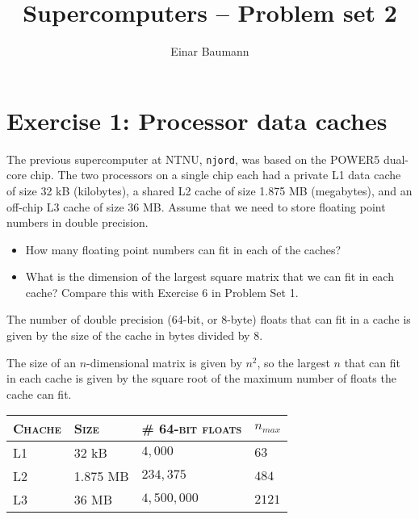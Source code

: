 




\title{Supercomputers -- Problem set 2}
\author{Einar Baumann}
\maketitle

\section{Exercise 1: Processor data caches} %
\label{sec:exercise_1}
\begin{question}
  The previous supercomputer at NTNU, \texttt{njord}, was based on the POWER5 dual-core chip. The two processors on a single chip each had a private L1 data cache of size 32 kB (kilobytes), a shared L2 cache of size 1.875 MB (megabytes), and an off-chip L3 cache of size 36 MB. Assume that we need to store floating point numbers in double precision. 

  \begin{itemize}
    \item How many floating point numbers can fit in each of the caches?
    \item What is the dimension of the largest square matrix that we can fit in each cache? Compare this with Exercise 6  in Problem Set 1.
  \end{itemize}
\end{question}


The number of double precision (64-bit, or 8-byte) floats that can fit in a cache is given by the size of the cache in bytes divided by 8.

The size of an $n$-dimensional matrix is given by $n^2$, so the largest $n$ that can fit in each cache is given by the square root of the maximum number of floats the cache can fit.

\begin{center}
  \begin{tabular}{llll}
  \toprule 
  \textsc{Chache} & \textsc{Size} & \# \textsc{64-bit floats} & $n_{max}$  \\
  \midrule
  L1 & 32 kB    & $4,000$     & $63$ \\
  L2 & 1.875 MB & $234,375$   & $484$ \\
  L3 & 36 MB    & $4,500,000$ & $2121$ \\
  \bottomrule
  \end{tabular}
\end{center}
\pagebreak


